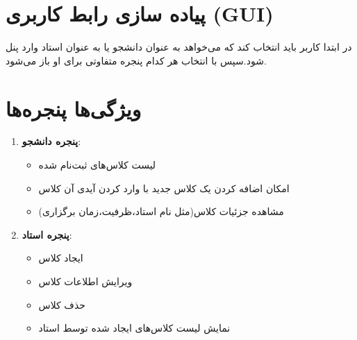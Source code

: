 \section*{پیاده سازی رابط کاربری (GUI)}
در ابتدا کاربر باید انتخاب کند که می‌خواهد به عنوان دانشجو یا به عنوان استاد وارد پنل شود.سپس با انتخاب هر کدام پنجره متفاوتی برای او باز می‌شود.

\section*{ویژگی‌ها پنجره‌ها}
\begin{enumerate}
    \item \textbf{پنجره دانشجو}:
    \begin{itemize}
        \item {لیست کلاس‌های ثبت‌نام شده}
        \item {امکان اضافه کردن یک کلاس جدید با وارد کردن آیدی آن کلاس}
        \item {مشاهده جزئیات کلاس(مثل نام استاد،ظرفیت،زمان برگزاری)}
    \end{itemize}
    \item \textbf{پنجره استاد}:
    \begin{itemize}
        \item {ایجاد کلاس}
        \item {ویرایش اطلاعات کلاس}
        \item {حذف کلاس}
        \item {نمایش لیست کلاس‌های ایجاد شده توسط استاد}
    \end{itemize}
\end{enumerate}